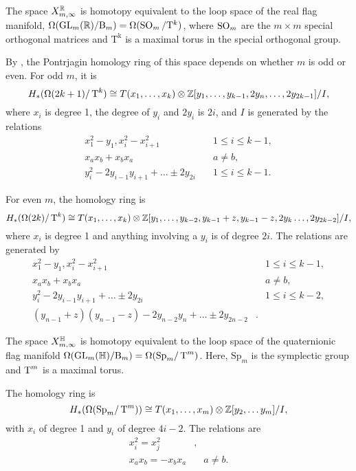 \begin{theorem}
  The space $X_{m,\infty}^{\mathbb{R}}$ is homotopy equivalent to the loop space
  of the real flag manifold,
  $\Omega(\operatorname{GL}_m(\mathbb{R})/\mathrm{B}_m) = \Omega(\operatorname{SO}_m/\mathrm{T}^{k})$, where
  $\operatorname{SO}_m$ are the $m \times m$ special orthogonal matrices and
  $\mathrm{T^k}$ is a maximal torus in the special orthogonal group.
  
  By \cite{grbic}, the Pontrjagin homology ring of this space depends
  on whether $m$ is odd or even. For odd $m$, it is
  \[ H_*(\Omega(2k+1)/\operatorname{T}^k) \cong T(x_1,\dots,x_k)\otimes
  \mathbb{Z}[y_1,\dots,y_{k-1},2y_n,\dots,2y_{2k-1}] / I, \]
  where $x_i$ is degree 1, the degree of $y_i$ and $2y_i$ is
  $2i$, and $I$ is generated by the relations
  \begin{align*}
    x_1^2-y_1, x_i^2-x_{i+1}^2&\quad 1 \leq i \leq k-1, \\
    x_a x_b + x_b x_a&\quad a \neq b, \\
    y_i^2-2y_{i-1}y_{i+1}+\dots\pm 2y_{2i}&\quad 1 \leq i \leq k-1.
  \end{align*}

  For even $m$, the homology ring is
  \[ H_*(\Omega(2k)/\operatorname{T}^k) \cong T(x_1,\dots,x_k)\otimes
  \mathbb{Z}[y_1,\dots,y_{k-2},y_{k-1}+z,y_{k-1}-z,2y_k\dots,2y_{2k-2}] /
  I, \]
  where $x_i$ is degree 1 and anything involving a $y_i$ is of degree
  $2i$. The relations are generated by
  \begin{align*}
    x_1^2-y_1, x_i^2-x_{i+1}^2& \quad 1 \leq i \leq k-1, \\
    x_ax_b+x_bx_a& \quad a\neq b, \\
    y_i^2-2y_{i-1}y_{i+1}+\dots\pm 2y_{2i}&\quad 1 \leq i \leq k-2,
    \\
    (y_{n-1}+z)(y_{n-1}-z)-2y_{n-2}y_n+\dots\pm 2y_{2n-2}&. 
  \end{align*}
\end{theorem}

\begin{theorem}
  The space $X_{m,\infty}^{\mathbb{H}}$ is homotopy equivalent to the loop
  space of the quaternionic flag manifold
  $\Omega(\operatorname{GL}_m(\mathbb{H})/\mathrm{B}_m) = \Omega(\mathrm{Sp}_m/\operatorname{T}^m)$.
  Here, $\mathrm{Sp}_m$ is the symplectic group and $\operatorname{T}^m$ is a
  maximal torus.

  The homology ring is
  \[ H_*(\Omega(\mathrm{Sp}_m/\operatorname{T}^m)) \cong T(x_1,\dots,x_m)\otimes
  \mathbb{Z}[y_2,\dots y_m] / I, \]
  with $x_i$ of degree 1 and $y_i$ of degree $4i-2$. The relations are
  \begin{align*}
    x_i^2 = x_j^2&,\\
    x_a x_b = -x_b x_a& \quad a\neq b.
  \end{align*}
\end{theorem}

